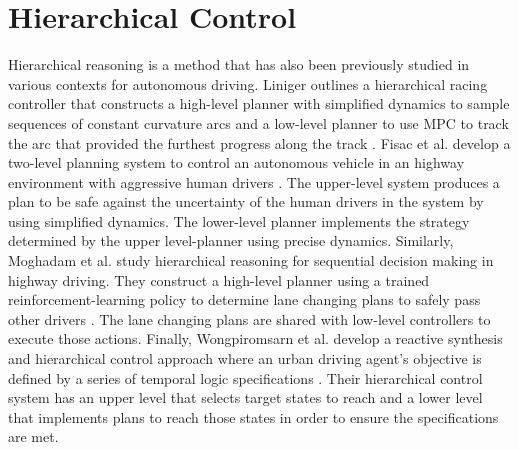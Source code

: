 \section{Hierarchical Control}
Hierarchical reasoning is a method that has also been previously studied in various contexts for autonomous driving. Liniger outlines a hierarchical racing controller that constructs a high-level planner with simplified dynamics to sample sequences of constant curvature arcs and a low-level planner to use MPC to track the arc that provided the furthest progress along the track \cite{LinigerThesis}. Fisac et al. develop a two-level planning system to control an autonomous vehicle in an highway environment with aggressive human drivers \cite{Fisac2019}. The upper-level system produces a plan to be safe against the uncertainty of the human drivers in the system by using simplified dynamics. The lower-level planner implements the strategy determined by the upper level-planner using precise dynamics. Similarly, Moghadam et al. study hierarchical reasoning for sequential decision making in highway driving. They construct a high-level planner using a trained reinforcement-learning policy to determine lane changing plans to safely pass other drivers \cite{Moghadam2019}. The lane changing plans are shared with low-level controllers to execute those actions. Finally, Wongpiromsarn et al. develop a reactive synthesis and hierarchical control approach where an urban driving agent's objective is defined by a series of temporal logic specifications \cite{Wongpiromsarn2012}. Their hierarchical control system has an upper level that selects target states to reach and a lower level that implements plans to reach those states in order to ensure the specifications are met.